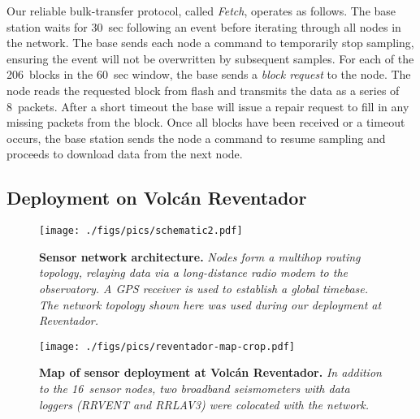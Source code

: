Our reliable bulk-transfer protocol, called {\em Fetch}, operates
as follows. The base station waits for 30~sec following an event
before iterating through all nodes in the network. The base sends each
node a command to temporarily stop sampling, ensuring the event
will not be overwritten by subsequent samples. 
For each of the 206~blocks in the 60~sec window, 
the base sends a {\em block request} to the node.
The node reads the requested block from flash and 
transmits the data as a series of 8~packets. 
After a short timeout the base will issue
a repair request to fill in any missing packets from the block.
Once all blocks have been received or a timeout occurs, the base 
station sends the node a command to resume sampling and proceeds 
to download data from the next node. 

\subsection{Deployment on Volc\'{a}n Reventador}

\begin{figure}[t]
\begin{center}
\texttt{[image: ./figs/pics/schematic2.pdf]}
\end{center}
\caption{\small {\bf Sensor network architecture.} {\em Nodes form a
multihop routing topology, relaying data via a long-distance radio
modem to the observatory. A GPS receiver is used to establish a global
timebase. The network topology shown here was used during
our deployment at Reventador.}}
\label{fig-schematic}
\end{figure}

\begin{figure}[t]
\begin{center}
\texttt{[image: ./figs/pics/reventador-map-crop.pdf]}
\end{center}
\caption{\small {\bf Map of sensor deployment at Volc\'{a}n Reventador.}
{\em In addition to the 16~sensor nodes, two broadband seismometers
with data loggers (RRVENT and RRLAV3) were colocated with the network.}}
\label{fig-map}
\end{figure}


